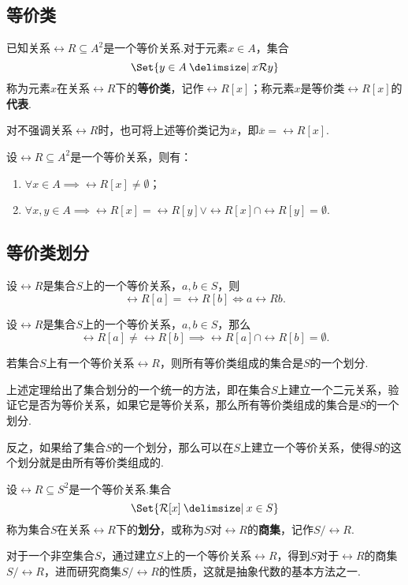 \subsection{等价类}
\begin{definition}
\def\R{\rel{R}}
已知关系\(\R \subseteq A^2\)是一个等价关系.对于元素\(x \in A\)，集合\[
\Set{y \in A \given x \R y}
\]称为元素\(x\)在关系\(\R\)下的\textbf{等价类}，记作\(\R[x]\)；称元素\(x\)是等价类\(\R[x]\)的\textbf{代表}.

对不强调关系\(\R\)时，也可将上述等价类记为\(\overline{x}\)，即\(\overline{x} = \R[x]\).
\end{definition}

\begin{property}
\def\R{\rel{R}}
设\(\R \subseteq A^2\)是一个等价关系，则有：
\begin{enumerate}
 \item \(\forall x \in A \implies \R[x] \neq \emptyset\)；
 \item \(\forall x,y \in A \implies \R[x] = \R[y] \lor \R[x] \cap \R[y] = \emptyset\).
\end{enumerate}
\end{property}

\subsection{等价类划分}
\begin{lemma}
设\(\rel{R}\)是集合\(S\)上的一个等价关系，\(a,b \in S\)，则\[
\rel{R}[a] = \rel{R}[b] \iff a \rel{R} b.
\]
\end{lemma}

\begin{lemma}
设\(\rel{R}\)是集合\(S\)上的一个等价关系，\(a,b \in S\)，那么\[
\rel{R}[a] \neq \rel{R}[b] \implies \rel{R}[a] \cap \rel{R}[b] = \emptyset.
\]
\end{lemma}

\begin{theorem}
若集合\(S\)上有一个等价关系\(\rel{R}\)，则所有等价类组成的集合是\(S\)的一个划分.
\end{theorem}
上述定理给出了集合划分的一个统一的方法，即在集合\(S\)上建立一个二元关系，验证它是否为等价关系，如果它是等价关系，那么所有等价类组成的集合是\(S\)的一个划分.

反之，如果给了集合\(S\)的一个划分，那么可以在\(S\)上建立一个等价关系，使得\(S\)的这个划分就是由所有等价类组成的.

\begin{definition}
设\(\rel{R} \subseteq S^2\)是一个等价关系.集合\[
\Set{\rel{R}[x] \given x \in S}
\]称为集合\(S\)在关系\(\rel{R}\)下的\textbf{划分}，或称为\(S\)对\(\rel{R}\)的\textbf{商集}，记作\(S/\rel{R}\).
\end{definition}
对于一个非空集合\(S\)，通过建立\(S\)上的一个等价关系\(\rel{R}\)，得到\(S\)对于\(\rel{R}\)的商集\(S/\rel{R}\)，进而研究商集\(S/\rel{R}\)的性质，这就是抽象代数的基本方法之一.

